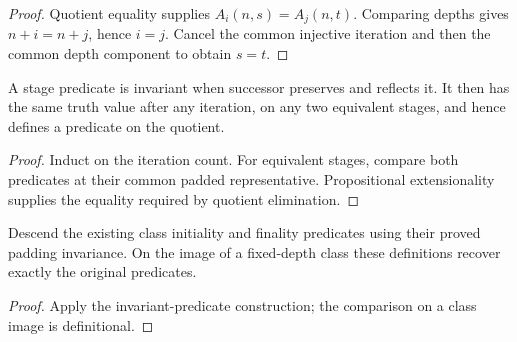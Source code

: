 \begin{proof}
Quotient equality supplies $A_i(n,s)=A_j(n,t)$. Comparing depths gives $n+i=n+j$, hence $i=j$. Cancel the common injective iteration and then the common depth component to obtain $s=t$.
\end{proof}




\begin{lemma}
A stage predicate is invariant when successor preserves and reflects it. It then has the same truth value after any iteration, on any two equivalent stages, and hence defines a predicate on the quotient.
\end{lemma}

\begin{proof}
Induct on the iteration count. For equivalent stages, compare both predicates at their common padded representative. Propositional extensionality supplies the equality required by quotient elimination.
\end{proof}






\begin{lemma}
Descend the existing class initiality and finality predicates using their proved padding invariance. On the image of a fixed-depth class these definitions recover exactly the original predicates.
\end{lemma}

\begin{proof}
Apply the invariant-predicate construction; the comparison on a class image is definitional.
\end{proof}




